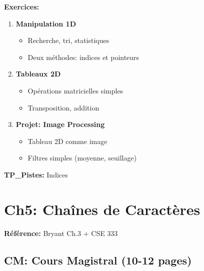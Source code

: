 \documentclass[10pt,a4paper]{article}
\begin{document}
\textbf{Exercices:}
\begin{enumerate}
\item \textbf{Manipulation 1D}
   \begin{itemize}
   \item Recherche, tri, statistiques
   \item Deux méthodes: indices et pointeurs
   \end{itemize}

\item \textbf{Tableaux 2D}
   \begin{itemize}
   \item Opérations matricielles simples
   \item Transposition, addition
   \end{itemize}

\item \textbf{Projet: Image Processing}
   \begin{itemize}
   \item Tableau 2D comme image
   \item Filtres simples (moyenne, seuillage)
   \end{itemize}
\end{enumerate}

\textbf{TP\_Pistes:} Indices

\newpage

\section{Ch5: Chaînes de Caractères}

\textbf{Référence:} Bryant Ch.3 + CSE 333

\subsection*{CM: Cours Magistral (10-12 pages)}
\end{document}
